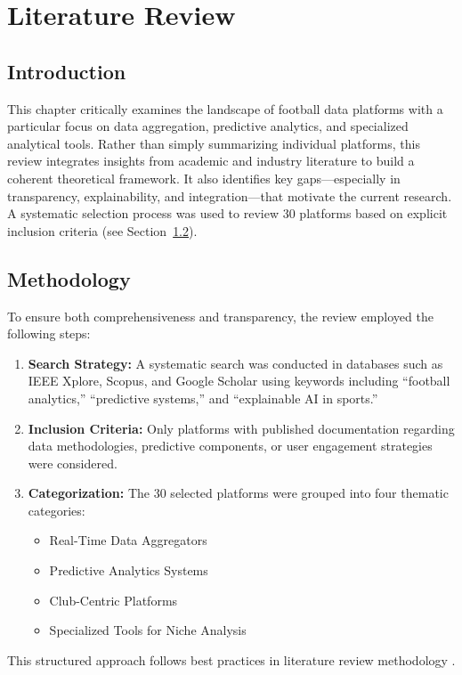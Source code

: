 \chapter{Literature Review}
\label{chap:literature-review}

\section{Introduction}
This chapter critically examines the landscape of football data platforms with a particular focus on data aggregation, predictive analytics, and specialized analytical tools. Rather than simply summarizing individual platforms, this review integrates insights from academic and industry literature to build a coherent theoretical framework. It also identifies key gaps—especially in transparency, explainability, and integration—that motivate the current research. A systematic selection process was used to review 30 platforms based on explicit inclusion criteria (see Section~\ref{sec:methodology}).

\section{Methodology}
\label{sec:methodology}
To ensure both comprehensiveness and transparency, the review employed the following steps:
\begin{enumerate}
    \item \textbf{Search Strategy:} A systematic search was conducted in databases such as IEEE Xplore, Scopus, and Google Scholar using keywords including ``football analytics,'' ``predictive systems,'' and ``explainable AI in sports.'' 
    \item \textbf{Inclusion Criteria:} Only platforms with published documentation regarding data methodologies, predictive components, or user engagement strategies were considered.
    \item \textbf{Categorization:} The 30 selected platforms were grouped into four thematic categories:
    \begin{itemize}
        \item Real-Time Data Aggregators
        \item Predictive Analytics Systems
        \item Club-Centric Platforms
        \item Specialized Tools for Niche Analysis
    \end{itemize}
\end{enumerate}
This structured approach follows best practices in literature review methodology \cite{methodology_ref}.

